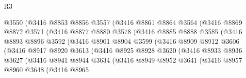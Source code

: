 \begin{lexlean}{R3}
\begin{coremodule}
                        @3550
                        (@3416
                          @8853
                          @8856
                          @3557
                          (@3416
                            @8861
                            @8864
                            @3564
                            (@3416
                              @8869
                              @8872
                              @3571
                              (@3416
                                @8877
                                @8880
                                @3578
                                (@3416
                                  @8885
                                  @8888
                                  @3585
                                  (@3416
                                    @8893
                                    @8896
                                    @3592
                                    (@3416
                                      @8901
                                      @8904
                                      @3599
                                      (@3416
                                        @8909
                                        @8912
                                        @3606
                                        (@3416
                                          @8917
                                          @8920
                                          @3613
                                          (@3416
                                            @8925
                                            @8928
                                            @3620
                                            (@3416
                                              @8933
                                              @8936
                                              @3627
                                              (@3416
                                                @8941
                                                @8944
                                                @3634
                                                (@3416
                                                  @8949
                                                  @8952
                                                  @3641
                                                  (@3416
                                                    @8957
                                                    @8960
                                                    @3648
                                                    (@3416
                                                      @8965

\end{coremodule}
\end{lexlean}

